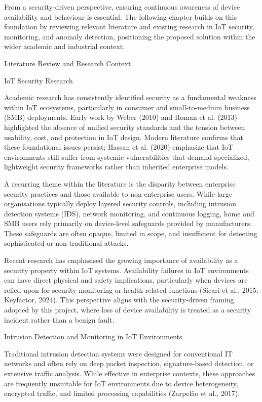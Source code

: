 From a security-driven perspective, ensuring continuous awareness of device availability and behaviour is essential. The following chapter builds on this foundation by reviewing relevant literature and existing research in IoT security, monitoring, and anomaly detection, positioning the proposed solution within the wider academic and industrial context.

Literature Review and Research Context

IoT Security Research

Academic research has consistently identified security as a fundamental weakness within IoT ecosystems, particularly in consumer and small-to-medium business (SMB) deployments. Early work by Weber (2010) and Roman et al. (2013) highlighted the absence of unified security standards and the tension between usability, cost, and protection in IoT design. Modern literature confirms that these foundational issues persist; Hassan et al. (2020) emphasize that IoT environments still suffer from systemic vulnerabilities that demand specialized, lightweight security frameworks rather than inherited enterprise models.

A recurring theme within the literature is the disparity between enterprise security practices and those available to non-enterprise users. While large organisations typically deploy layered security controls, including intrusion detection systems (IDS), network monitoring, and continuous logging, home and SMB users rely primarily on device-level safeguards provided by manufacturers. These safeguards are often opaque, limited in scope, and insufficient for detecting sophisticated or non-traditional attacks.

Recent research has emphasised the growing importance of availability as a security property within IoT systems. Availability failures in IoT environments can have direct physical and safety implications, particularly when devices are relied upon for security monitoring or health-related functions (Sicari et al., 2015; Keyfactor, 2024). This perspective aligns with the security-driven framing adopted by this project, where loss of device availability is treated as a security incident rather than a benign fault.

Intrusion Detection and Monitoring in IoT Environments

Traditional intrusion detection systems were designed for conventional IT networks and often rely on deep packet inspection, signature-based detection, or extensive traffic analysis. While effective in enterprise contexts, these approaches are frequently unsuitable for IoT environments due to device heterogeneity, encrypted traffic, and limited processing capabilities (Zarpelão et al., 2017).

